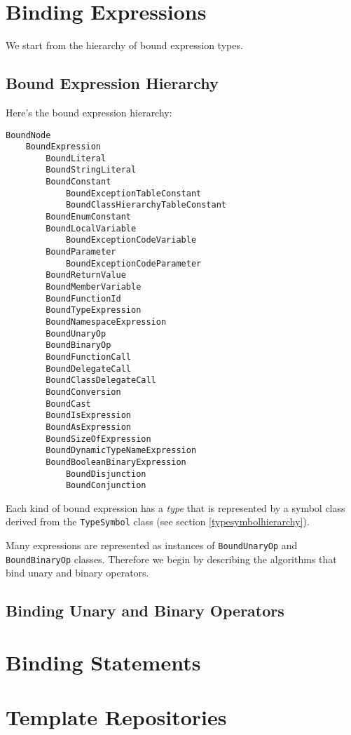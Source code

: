 \documentclass[a4paper,oneside,11pt]{book}
\theoremstyle{definition}
\begin{document}
\chapter{Binding Expressions}

We start from the hierarchy of bound expression types.

\section{Bound Expression Hierarchy}

Here's the bound expression hierarchy:

\begin{verbatim}
BoundNode
    BoundExpression
        BoundLiteral
        BoundStringLiteral
        BoundConstant
            BoundExceptionTableConstant
            BoundClassHierarchyTableConstant
        BoundEnumConstant
        BoundLocalVariable
            BoundExceptionCodeVariable
        BoundParameter
            BoundExceptionCodeParameter
        BoundReturnValue
        BoundMemberVariable
        BoundFunctionId
        BoundTypeExpression
        BoundNamespaceExpression
        BoundUnaryOp
        BoundBinaryOp
        BoundFunctionCall
        BoundDelegateCall
        BoundClassDelegateCall
        BoundConversion
        BoundCast
        BoundIsExpression
        BoundAsExpression
        BoundSizeOfExpression
        BoundDynamicTypeNameExpression
        BoundBooleanBinaryExpression
            BoundDisjunction
            BoundConjunction
\end{verbatim}

Each kind of bound expression has a \emph{type} that is represented by a symbol class derived from the \verb|TypeSymbol| class
(see section \ref{typesymbolhierarchy}).

Many expressions are represented as instances of \verb|BoundUnaryOp| and \verb|BoundBinaryOp| classes.
Therefore we begin by describing the algorithms that bind unary and binary operators.

\section{Binding Unary and Binary Operators}

\chapter{Binding Statements}

\chapter{Template Repositories}
\end{document}
